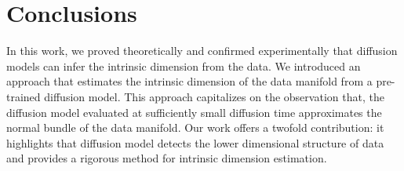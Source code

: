     \begin{table}[ht]
    \centering
    \vspace{8pt} %
    \caption{Comparison of dimensionality detection methods on various data manifolds.}
    \label{ch3:tbl:results}
    \end{table}
    

\section{Conclusions}
\label{ch3:sec:conclusions}
In this work, we proved theoretically and confirmed experimentally that diffusion models can infer the intrinsic dimension from the data. We introduced an approach that estimates the intrinsic dimension of the data manifold from a pre-trained diffusion model. This approach capitalizes on the observation that, the diffusion model evaluated at sufficiently small diffusion time approximates the normal bundle of the data manifold.  Our work offers a twofold contribution: it highlights that diffusion model detects the lower dimensional structure of data and provides a rigorous method for intrinsic dimension estimation. 

